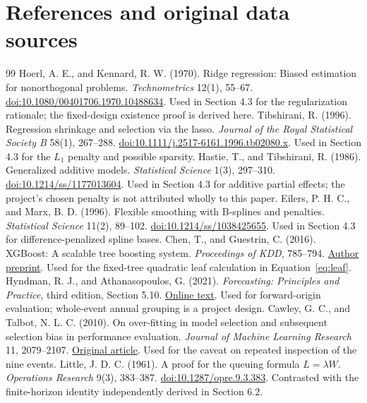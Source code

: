 \clearpage
\section{References and original data sources}
\begingroup\small
\begin{thebibliography}{99}\setlength{\itemsep}{1pt}
 Hoerl, A. E., and Kennard, R. W. (1970). Ridge regression: Biased estimation for nonorthogonal problems. \emph{Technometrics} 12(1), 55--67. \href{https://doi.org/10.1080/00401706.1970.10488634}{doi:10.1080/00401706.1970.10488634}. Used in Section 4.3 for the regularization rationale; the fixed-design existence proof is derived here.
 Tibshirani, R. (1996). Regression shrinkage and selection via the lasso. \emph{Journal of the Royal Statistical Society B} 58(1), 267--288. \href{https://doi.org/10.1111/j.2517-6161.1996.tb02080.x}{doi:10.1111/j.2517-6161.1996.tb02080.x}. Used in Section 4.3 for the $L_1$ penalty and possible sparsity.
 Hastie, T., and Tibshirani, R. (1986). Generalized additive models. \emph{Statistical Science} 1(3), 297--310. \href{https://doi.org/10.1214/ss/1177013604}{doi:10.1214/ss/1177013604}. Used in Section 4.3 for additive partial effects; the project's chosen penalty is not attributed wholly to this paper.
 Eilers, P. H. C., and Marx, B. D. (1996). Flexible smoothing with B-splines and penalties. \emph{Statistical Science} 11(2), 89--102. \href{https://doi.org/10.1214/ss/1038425655}{doi:10.1214/ss/1038425655}. Used in Section 4.3 for difference-penalized spline bases.
 Chen, T., and Guestrin, C. (2016). XGBoost: A scalable tree boosting system. \emph{Proceedings of KDD}, 785--794. \href{https://arxiv.org/abs/1603.02754}{Author preprint}. Used for the fixed-tree quadratic leaf calculation in Equation~\eqref{eq:leaf}.
 Hyndman, R. J., and Athanasopoulos, G. (2021). \emph{Forecasting: Principles and Practice}, third edition, Section 5.10. \href{https://otexts.com/fpp3/tscv.html}{Online text}. Used for forward-origin evaluation; whole-event annual grouping is a project design.
 Cawley, G. C., and Talbot, N. L. C. (2010). On over-fitting in model selection and subsequent selection bias in performance evaluation. \emph{Journal of Machine Learning Research} 11, 2079--2107. \href{https://www.jmlr.org/papers/v11/cawley10a.html}{Original article}. Used for the caveat on repeated inspection of the nine events.
 Little, J. D. C. (1961). A proof for the queuing formula $L=\lambda W$. \emph{Operations Research} 9(3), 383--387. \href{https://doi.org/10.1287/opre.9.3.383}{doi:10.1287/opre.9.3.383}. Contrasted with the finite-horizon identity independently derived in Section 6.2.

\end{thebibliography}
